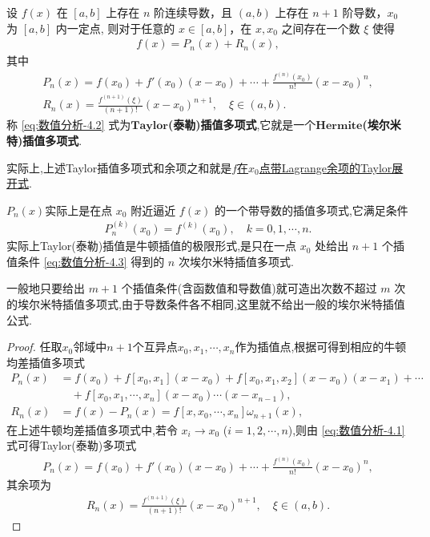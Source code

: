 \documentclass[../../main.tex]{subfiles}
\begin{document}
\begin{theorem}
设 $f(x)$ 在 $[a, b]$ 上存在 $n$ 阶连续导数，且 $(a, b)$ 上存在 $n + 1$ 阶导数，$x_0$ 为 $[a, b]$ 内一定点,
则对于任意的 $x \in [a, b]$，在 $x, x_0$ 之间存在一个数 $\xi$ 使得
\begin{align*}
f(x) = P_n(x)+R_n(x),
\end{align*}
其中
\begin{gather}
P_n(x) = f(x_0) + f'(x_0)(x - x_0) + \cdots + \frac{f^{(n)}(x_0)}{n!}(x - x_0)^n,\label{eq:数值分析-4.2}
\\
R_n(x) = \frac{f^{(n+1)}(\xi)}{(n+1)!}(x - x_0)^{n+1}, \quad \xi \in (a, b).\label{eq:数值分析-4.4}
\end{gather}
称 \eqref{eq:数值分析-4.2} 式为$\mathbf{Taylor}$\textbf{(泰勒)插值多项式},它就是一个$\mathbf{Hermite}$\textbf{(埃尔米特)插值多项式}.
\end{theorem}
\begin{remark}
实际上,上述Taylor插值多项式和余项之和就是\hyperref[Basis of Analytics-theorem:带各种余项的Taylor公式]{$f$在$x_0$点带Lagrange余项的Taylor展开式}.
\end{remark}
\begin{remark}
$P_n(x)$实际上是在点 $x_0$ 附近逼近 $f(x)$ 的一个带导数的插值多项式,它满足条件
\begin{align}
P_n^{(k)}(x_0) = f^{(k)}(x_0), \quad k = 0, 1, \cdots, n. \label{eq:数值分析-4.3}
\end{align}
实际上Taylor(泰勒)插值是牛顿插值的极限形式,是只在一点 $x_0$ 处给出 $n + 1$ 个插值条件 \eqref{eq:数值分析-4.3} 得到的 $n$ 次埃尔米特插值多项式.

一般地只要给出 $m + 1$ 个插值条件(含函数值和导数值)就可造出次数不超过 $m$ 次的埃尔米特插值多项式,由于导数条件各不相同,这里就不给出一般的埃尔米特插值公式.
\end{remark}
\begin{proof}
任取$x_0$邻域中$n+1$个互异点$x_0,x_1,\cdots,x_n$作为插值点,根据可得到相应的牛顿均差插值多项式
\begin{align*}
P_n(x) &= f(x_0) + f[x_0, x_1](x - x_0) + f[x_0, x_1, x_2](x - x_0)(x - x_1) + \cdots  \\
&\quad + f[x_0, x_1, \cdots, x_n](x - x_0) \cdots (x - x_{n-1}),\\
R_n(x) &= f(x) - P_n(x) = f[x, x_0, \cdots, x_n]\omega_{n+1}(x),
\end{align*}
在上述牛顿均差插值多项式中,若令 $x_i \to x_0$ ($i = 1, 2, \cdots, n$),则由 \eqref{eq:数值分析-4.1} 式可得Taylor(泰勒)多项式
\begin{align*}
P_n(x) = f(x_0) + f'(x_0)(x - x_0) + \cdots + \frac{f^{(n)}(x_0)}{n!}(x - x_0)^n, 
\end{align*}
其余项为
\begin{align*}
R_n(x) = \frac{f^{(n+1)}(\xi)}{(n+1)!}(x - x_0)^{n+1}, \quad \xi \in (a, b). 
\end{align*}

\end{proof}
\end{document}

